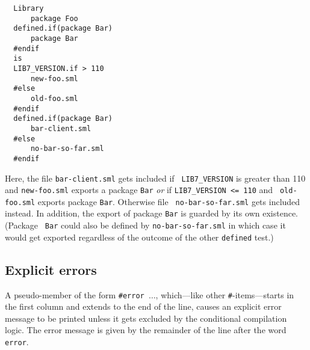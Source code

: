 \begin{verbatim}
  Library
      package Foo
  defined.if(package Bar)
      package Bar
  #endif
  is
  LIB7_VERSION.if > 110
      new-foo.sml
  #else
      old-foo.sml
  #endif
  defined.if(package Bar)
      bar-client.sml
  #else
      no-bar-so-far.sml
  #endif
\end{verbatim}

Here, the file {\tt bar-client.sml} gets included if {\tt
LIB7\_VERSION} is greater than 110 and {\tt new-foo.sml} exports a
package {\tt Bar} {\em or} if {\tt LIB7\_VERSION <= 110} and {\tt
old-foo.sml} exports package {\tt Bar}.  Otherwise file {\tt
no-bar-so-far.sml} gets included instead.  In addition, the export of
package {\tt Bar} is guarded by its own existence.  (Package {\tt
Bar} could also be defined by {\tt no-bar-so-far.sml} in
which case it would get exported regardless of the outcome of the
other {\tt defined} test.)

\subsection{Explicit errors}

A pseudo-member of the form {\tt \#error $\ldots$}, which---like other
{\tt \#}-items---starts in the first column and extends to the end of
the line, causes an explicit error message to be printed unless it
gets excluded by the conditional compilation logic.  The error message
is given by the remainder of the line after the word {\tt error}.
